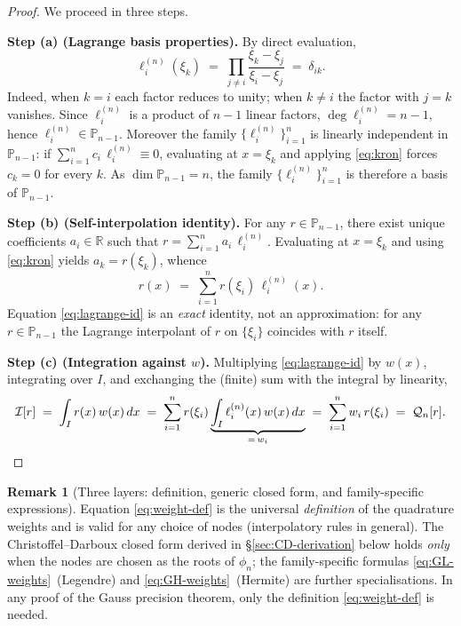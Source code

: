 \documentclass[11pt,a4paper]{article}
\theoremstyle{definition}
\newtheorem{remark}[theorem]{Remark}
\newcommand{\R}{\mathbb{R}}
\newcommand{\PP}{\mathbb{P}}
\newcommand{\I}{\mathcal{I}}
\newcommand{\Q}{\mathcal{Q}}
\begin{document}
\begin{proof}
We proceed in three steps.

\textbf{Step (a) (Lagrange basis properties).}
By direct evaluation,
\begin{equation}
  \ell_i^{(n)}(\xi_k) \;=\; \prod_{j\neq i}\frac{\xi_k-\xi_j}{\xi_i-\xi_j}
                       \;=\; \delta_{ik}.
  \label{eq:kron}
\end{equation}
Indeed, when $k=i$ each factor reduces to unity; when $k\neq i$ the factor
with $j=k$ vanishes. Since $\ell_i^{(n)}$ is a product of $n-1$ linear factors,
$\deg\ell_i^{(n)}=n-1$, hence $\ell_i^{(n)}\in\PP_{n-1}$. Moreover the family
$\{\ell_i^{(n)}\}_{i=1}^n$ is linearly independent in $\PP_{n-1}$: if
$\sum_{i=1}^n c_i\,\ell_i^{(n)}\equiv 0$, evaluating at $x=\xi_k$ and applying
\eqref{eq:kron} forces $c_k=0$ for every $k$. As $\dim\PP_{n-1}=n$, the family
$\{\ell_i^{(n)}\}_{i=1}^n$ is therefore a basis of $\PP_{n-1}$.

\textbf{Step (b) (Self-interpolation identity).}
For any $r\in\PP_{n-1}$, there exist unique coefficients $a_i\in\R$ such that
$r=\sum_{i=1}^n a_i\,\ell_i^{(n)}$. Evaluating at $x=\xi_k$ and using
\eqref{eq:kron} yields $a_k=r(\xi_k)$, whence
\begin{equation}
  r(x) \;=\; \sum_{i=1}^n r(\xi_i)\,\ell_i^{(n)}(x).
  \label{eq:lagrange-id}
\end{equation}
Equation \eqref{eq:lagrange-id} is an \emph{exact} identity, not an
approximation: for any $r\in\PP_{n-1}$ the Lagrange interpolant of $r$ on
$\{\xi_i\}$ coincides with $r$ itself.

\textbf{Step (c) (Integration against $w$).}
Multiplying \eqref{eq:lagrange-id} by $w(x)$, integrating over $I$, and
exchanging the (finite) sum with the integral by linearity,
\[
  \I[r] \;=\; \int_I r(x)\,w(x)\,dx
        \;=\; \sum_{i=1}^n r(\xi_i)\underbrace{\int_I \ell_i^{(n)}(x)\,w(x)\,dx}_{=\,w_i}
        \;=\; \sum_{i=1}^n w_i\,r(\xi_i) \;=\; \Q_n[r]. \qedhere
\]
\end{proof}

\begin{remark}[Three layers: definition, generic closed form, and family-specific
expressions]\label{rmk:three-layers}
Equation \eqref{eq:weight-def} is the universal \emph{definition} of the
quadrature weights and is valid for any choice of nodes (interpolatory rules in
general). The Christoffel--Darboux closed form derived in
\S\ref{sec:CD-derivation} below holds \emph{only} when the nodes are chosen as
the roots of $\phi_n$; the family-specific formulas
\eqref{eq:GL-weights}~(Legendre) and \eqref{eq:GH-weights}~(Hermite) are
further specialisations. In any proof of the Gauss precision theorem, only the
definition \eqref{eq:weight-def} is needed.
\end{remark}
\end{document}
